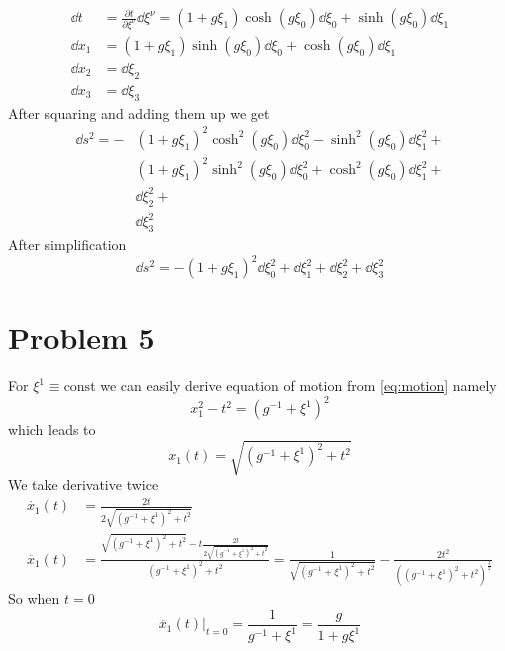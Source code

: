 \begin{align}
	\dd t   & = \frac{\partial t}{\partial \xi^\nu}\dd \xi^\nu =
	(1 + g\xi_1)\cosh(g\xi_0) \dd \xi_0 + \sinh(g\xi_0) \dd \xi_1             \\
	\dd x_1 & = (1 + g\xi_1)\sinh(g\xi_0) \dd \xi_0 + \cosh(g\xi_0) \dd \xi_1 \\
	\dd x_2 & = \dd \xi_2                                                     \\
	\dd x_3 & = \dd \xi_3
\end{align}
After squaring and adding them up we get
%
\begin{align}
	\dd s^2 =  - & (1 + g\xi_1)^2\cosh^2(g\xi_0) \dd \xi_0^2 - \sinh^2(g\xi_0) \dd \xi_1^2 +           \\
	             & (1 + g\xi_1)^2\sinh^2(g\xi_0) \dd \xi_0^2 + \cosh^2(g\xi_0) \dd \xi_1^2 + \nonumber \\
	             & \dd \xi_2^2 +                                                             \nonumber \\
	             & \dd \xi_3^2 \nonumber
\end{align}
After simplification
\begin{equation}
	\dd s^2 = -(1+g\xi_1)^2\dd\xi_0^2 + \dd\xi_1^2 + \dd\xi_2^2 + \dd\xi_3^2
	\label{eq:action}
\end{equation}

\section*{Problem 5}

For $\xi^1 \equiv \text{const}$ we can easily derive equation of motion from
\autoref{eq:motion} namely
%
\begin{equation}
	x_1^2 - t^2 = (g^{-1}+\xi^1)^2
\end{equation}
%
which leads to
%
\begin{equation}
	x_1(t) = \sqrt{(g^{-1}+\xi^1)^2 + t^2}
	\label{eq:sqrt}
\end{equation}
%
We take derivative twice
%
\begin{align}
	\dot{x_1}(t)  & = \frac{2t}{2\sqrt{(g^{-1}+\xi^1)^2 + t^2}} \\
	\ddot{x_1}(t) & =
	\frac{\sqrt{(g^{-1}+\xi^1)^2 + t^2} -
		t \frac{2t}{2\sqrt{(g^{-1}+\xi^1)^2 + t^2}}}{(g^{-1}+\xi^1)^2 + t^2} =
	\frac{1}{\sqrt{(g^{-1}+\xi^1)^2 + t^2}} -
	\frac{2t^2}{((g^{-1}+\xi^1)^2 + t^2)^{\frac{3}{2}}}
\end{align}
%
So when $t=0$
%
\begin{equation}
	\ddot{x_1}(t)\Big|_{t=0} = \frac{1}{g^{-1}+\xi^1} = \frac{g}{1+g\xi^1}
\end{equation}


